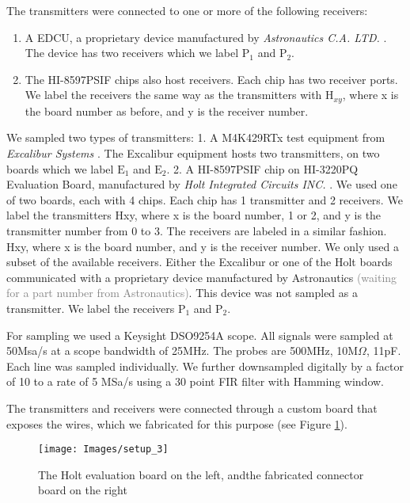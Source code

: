 \documentclass[conference]{IEEEtran}
\begin{document}
  The transmitters were connected to one or more of the following receivers:
  \begin{enumerate}
    \item A EDCU, a proprietary device manufactured by \textit{Astronautics C.A. LTD.} \cite{astronautics2019edcu}. The device has two receivers which we label \(\text{P}_1\) and \(\text{P}_2\).
    \item The HI-8597PSIF chips also host receivers. Each chip has two receiver ports. We label the receivers the same way as the transmitters with \(\text{H}_{xy}\), where x is the board number as before, and y is the receiver number.
  \end{enumerate}
  
  We sampled two types of transmitters: 1. A M4K429RTx test equipment from \textit{Excalibur Systems} \cite{}. The Excalibur equipment hosts two transmitters, on two boards which we label \(\text{E}_1\) and \(\text{E}_2\). 2. A HI-8597PSIF chip on HI-3220PQ Evaluation Board, manufactured by \textit{Holt Integrated Circuits INC.} \cite{}. We used one of two boards, each with 4 chips. Each chip has 1 transmitter and 2 receivers. We label the transmitters H{x}{y}, where x is the board number, 1 or 2, and y is the transmitter number from 0 to 3. The receivers are labeled in a similar fashion. H{x}{y}, where x is the board number, and y is the receiver number. We only used a subset of the available receivers. Either the Excalibur or one of the Holt boards communicated with a proprietary device manufactured by Astronautics \textcolor{gray}{(waiting for a part number from Astronautics)}. This device was not sampled as a transmitter. We label the receivers \(\text{P}_1\) and \(\text{P}_2\).
  
  For sampling we used a Keysight DSO9254A scope. All signals were sampled at 50Msa/s at a scope bandwidth of 25MHz. The probes are 500MHz, 10M\(\Omega\), 11pF. Each line was sampled individually. We further downsampled digitally by a factor of 10 to a rate of 5 MSa/s using a 30 point FIR filter with Hamming window.
  
  The transmitters and receivers were connected through a custom board that exposes the wires, which we fabricated for this purpose (see Figure \ref{fig:SetupImage}).
  
  \begin{figure}[t]
    \centering
    \texttt{[image: Images/setup\_3]}
    \caption{The Holt evaluation board on the left, andthe fabricated connector board on the right}
    \label{fig:SetupImage}
  \end{figure}
  
\end{document}
